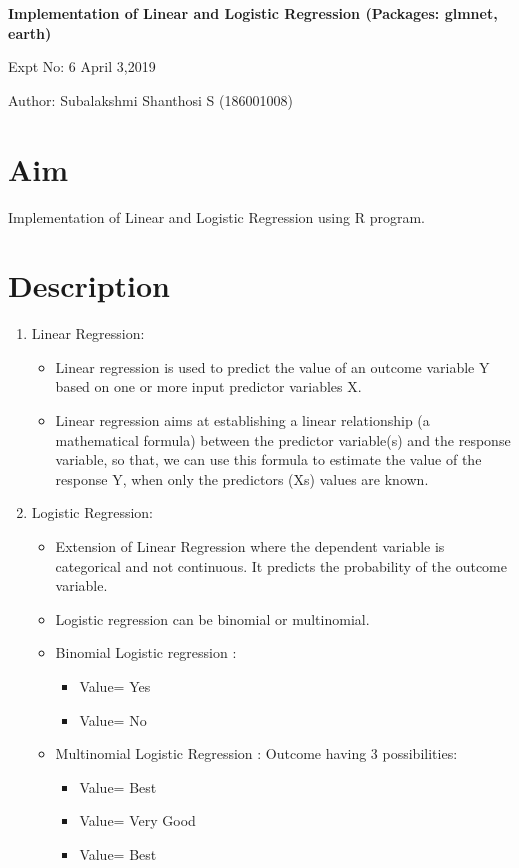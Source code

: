 \documentclass[a4paper,10pt]{article}
\begin{document}
\setcounter{secnumdepth}{-1} 

\begin{center}
\textbf{\LARGE  Implementation of Linear and Logistic Regression (Packages: glmnet, earth)}
\end{center}

\raggedright Expt No: 6 \hfill \raggedleft April 3,2019 \\ 

\raggedright Author: Subalakshmi Shanthosi S (186001008) \par 

\noindent\makebox[\linewidth]{\rule{\textwidth}{1pt}} 

\section{Aim}
Implementation of Linear and Logistic Regression using R program.

\section{Description}
\begin{enumerate}
	\item Linear Regression:
	\begin{itemize}
		\item Linear regression is used to predict the value of an outcome variable Y based on one or more input predictor variables X.
		\item Linear regression aims at establishing a linear relationship (a mathematical formula) between the predictor variable(s) and the response variable, so that, we can use this formula to estimate the value of the response Y, when only the predictors (Xs) values are known.	 	
	\end{itemize}
	\item Logistic Regression:

	\begin{itemize}
		\item Extension of Linear Regression where the dependent variable is categorical and not continuous. It predicts the probability of the outcome variable.
		\item Logistic regression can be binomial or multinomial.
		\item Binomial Logistic regression : 
		  \begin{itemize}
		  	\item Value= Yes
		  	\item Value= No
		  \end{itemize}
		\item Multinomial Logistic Regression : Outcome having 3 possibilities:
		\begin{itemize}
	         \item Value= Best
	         \item Value= Very Good
	         \item Value= Best
		\end{itemize}
	\end{itemize}

\end{enumerate}
\end{document}
